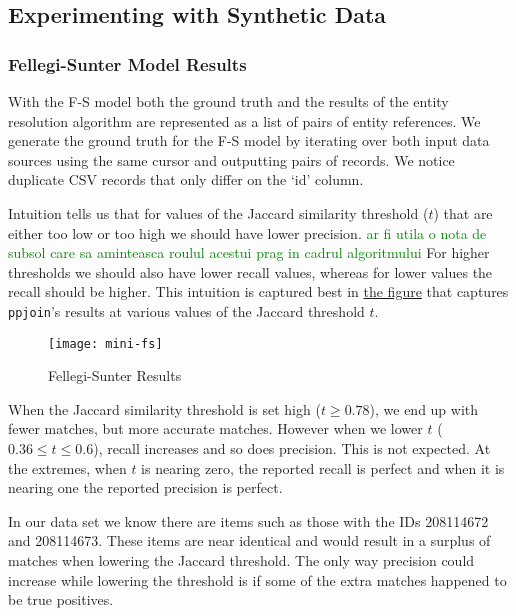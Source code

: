 \documentclass[11pt]{article}
\begin{document}
    \subsection{Experimenting with Synthetic Data}

    \subsubsection{Fellegi-Sunter Model Results}
    
    With the F-S model both the ground truth and the results of the entity
    resolution algorithm are represented as a list of pairs of entity
    references.
    We generate the ground truth for the F-S model by iterating over both
    input data sources using the same cursor and outputting pairs of records.
    We notice duplicate CSV records that only differ on the `id' column.

    Intuition tells us that for values of the Jaccard similarity threshold ($t$)
    that are either too low or too high we should have lower precision.
    \textcolor{green}{ar fi utila o nota de subsol care sa aminteasca roulul acestui prag in cadrul algoritmului} 
    For higher thresholds we should also have lower recall values, whereas for
    lower values the recall should be higher.
    This intuition is captured best in \hyperref[fsfig]{the figure} that
    captures \texttt{ppjoin}'s results at various values of the Jaccard
    threshold $t$.

    \begin{figure}
        \centering
        \texttt{[image: mini-fs]}
        \caption{Fellegi-Sunter Results}\label{fsfig}
    \end{figure}

    When the Jaccard similarity threshold is set high ($t \geq 0.78$), we end up
    with fewer matches, but more accurate matches.
    However when we lower $t$ ($0.36 \leq t \leq 0.6$), recall increases and
    so does precision.
    This is not expected.
    At the extremes, when $t$ is nearing zero, the reported recall is perfect
    and when it is nearing one the reported precision is perfect.
    
    In our data set we know there are items such as those with the IDs
    208114672 and 208114673.
    These items are near identical and would result in a surplus of matches
    when lowering the Jaccard threshold.
    The only way precision could increase while lowering the threshold is if
    some of the extra matches happened to be true positives.
\end{document}
